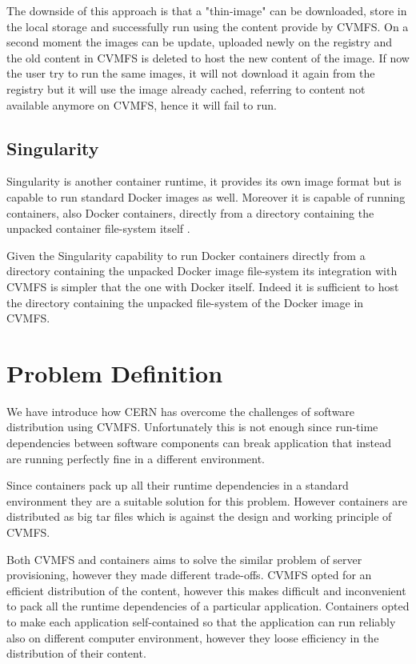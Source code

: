 The downside of this approach is that a "thin-image" can be downloaded, store in
the local storage and successfully run using the content provide by CVMFS. On a
second moment the images can be update, uploaded newly on the registry and the
old content in CVMFS is deleted to host the new content of the image. If now
the user try to run the same images, it will not download it again from the
registry but it will use the image already cached, referring
to content not available anymore on CVMFS, hence it will fail to run.

\subsection{Singularity}

Singularity \citep{singularity:home} is another container runtime, it provides
its own image format but is capable to run standard Docker images
\cite{singularity:docker} as well.  Moreover it is capable of running
containers, also Docker containers, directly from a directory containing the
unpacked container file-system itself \cite{singularity:run}.

Given the Singularity capability to run Docker containers directly from a
directory containing the unpacked Docker image file-system its integration with
CVMFS is simpler that the one with Docker itself. Indeed it is sufficient to
host the directory containing the unpacked file-system of the Docker image in
CVMFS.

\section{Problem Definition}

We have introduce how CERN has overcome the challenges of software distribution
using CVMFS. Unfortunately this is not enough since run-time dependencies
between software components can break application that instead are running
perfectly fine in a different environment.

Since containers pack up all their runtime dependencies in a standard
environment they are a suitable solution for this problem. However containers
are distributed as big tar files which is against the design and working
principle of CVMFS.

Both CVMFS and containers aims to solve the similar problem of server
provisioning, however they made different trade-offs. CVMFS opted for an
efficient distribution of the content, however this makes difficult and
inconvenient to pack all the runtime dependencies of a particular application.
Containers opted to make each application self-contained so that the
application can run reliably also on different computer environment, however
they loose efficiency in the distribution of their content.

